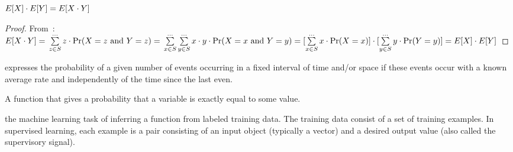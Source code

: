 \begin{theorem}
    $ \newline E[X] \cdot E[Y] = E[X \cdot Y]$
\end{theorem}
\begin{proof}
    From~: \newline
    $
    E[X \cdot Y] = \newline \sum\limits_{z \in S}^{\dots} z \cdot 
        \Pr(X = z \text{ and } Y = z) = \newline
    \sum\limits_{x \in S}^{\dots}\sum\limits_{y \in S}^{\dots} x \cdot y
    \cdot \Pr(X = x \text{ and } Y=y) = \newline
    [\sum\limits_{x \in S}^{\dots} x \cdot \Pr(X = x)] \cdot  
    [\sum\limits_{y \in S}^{\dots} y \cdot \Pr(Y = y)]  = \newline
    E[X] \cdot E[Y]
    $
\end{proof}

\begin{definition}
    expresses the probability of a given number of events occurring in a fixed
    interval of time and/or space if these events occur with a known average
    rate and independently of the time since the last even.

\end{definition}

\begin{definition}
    A function that gives a probability that a variable is exactly equal to
    some value.
\end{definition}

\begin{definition}
    the machine learning task of inferring a function from labeled training
    data. The training data consist of a set of training examples. In
    supervised learning, each example is a pair consisting of an input object
    (typically a vector) and a desired output value (also called the
    supervisory signal).

\end{definition}
